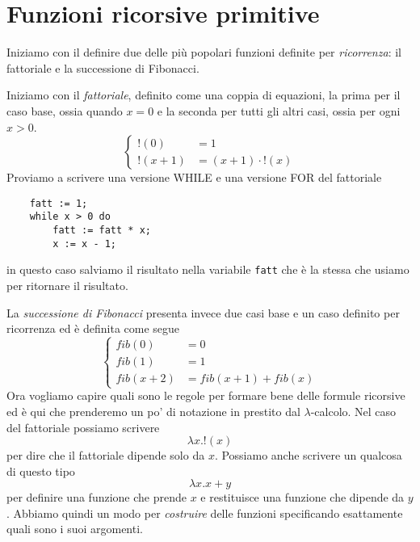 \section{Funzioni ricorsive primitive}
Iniziamo con il definire due delle più popolari funzioni
definite per \emph{ricorrenza}: il fattoriale e la successione
di Fibonacci.

Iniziamo con il \emph{fattoriale}, definito come una coppia
di equazioni, la prima per il caso base, ossia quando $x = 0$
e la seconda per tutti gli altri casi, ossia per ogni $x > 0$.
\[
	\begin{cases}
		!(0)     & = 1                  \\
		!(x + 1) & = (x + 1) \cdot !(x)
	\end{cases}
\]
Proviamo a scrivere una versione WHILE e una versione FOR del
fattoriale
\begin{verbatim}
    fatt := 1;
    while x > 0 do
        fatt := fatt * x;
        x := x - 1;
\end{verbatim}
in questo caso salviamo il risultato nella variabile
\verb|fatt| che è la stessa che usiamo per ritornare il
risultato.

La \emph{successione di Fibonacci} presenta invece due casi
base e un caso definito per ricorrenza ed è definita come
segue
\[
	\begin{cases}
		fib(0)     & = 0                   \\
		fib(1)     & = 1                   \\
		fib(x + 2) & = fib(x + 1) + fib(x)
	\end{cases}
\]
Ora vogliamo capire quali sono le regole per formare bene
delle formule ricorsive ed è qui che prenderemo un po' di
notazione in prestito dal $\lambda$-calcolo. Nel caso del
fattoriale possiamo scrivere
\[ \lambda x . !(x) \]
per dire che il fattoriale dipende solo da $x$. Possiamo anche
scrivere un qualcosa di questo tipo
\[ \lambda x . x + y \]
per definire una funzione che prende $x$ e restituisce una
funzione che dipende da $y$. Abbiamo quindi un modo per
\emph{costruire} delle funzioni specificando esattamente quali
sono i suoi argomenti.

